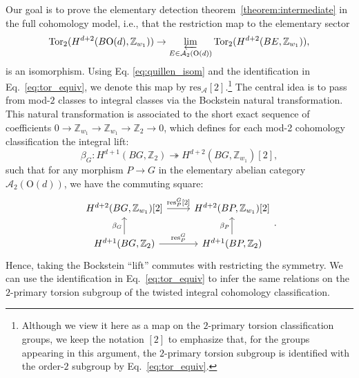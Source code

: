 \documentclass[aps,prx,reprint,superscriptaddress,twocolumn,amsmath,amssymb,amsfonts, nofootinbib]{revtex4-2}
\newcommand{\res}{\text{res}}
\newcommand{\tor}{\text{Tor}}
\newcommand{\Z}{\mathbb{Z}}
\theoremstyle{apsstyle}
\begin{document}
{Our goal is to prove the elementary detection theorem~\ref{theorem:intermediate} in the full cohomology model, i.e., that the restriction map to the elementary sector
\begin{equation*}
  \tor_{2}(H^{d+2}(B\mathrm{O}(d), \Z_{w_{1}}))\to
  \varprojlim_{E\in\mathcal A_{2}(\mathrm{O}(d))}\tor_{2}(H^{d+2}(BE, \Z_{w_{1}})),
\end{equation*}
is an isomorphism. Using Eq. \ref{eq:quillen_isom} and the identification in Eq.~\ref{eq:tor_equiv}, we denote this map by $\res_{\mathcal A}[2]$.\footnote{Although we view it here as a map on the $2$-primary torsion classification groups, we keep the notation $[2]$ to emphasize that, for the groups appearing in this argument, the $2$-primary torsion subgroup is identified with the order-$2$ subgroup by Eq.~\ref{eq:tor_equiv}.} The central idea is to pass from mod-$2$ classes to integral classes via the Bockstein natural transformation. This natural transformation is associated to the short exact sequence of coefficients $0\to \Z_{w_{1}} \to \Z_{w_{1}} \to \Z_{2}\to 0$, which defines for each mod-2 cohomology classification the integral lift: 
\begin{equation*}
    \beta_{G}: H^{d+1}(BG, \Z_{2}) \twoheadrightarrow H^{d+2}(BG, \Z_{w_{1}})[2],
\end{equation*}
such that for any morphism $P \to G$ in the elementary abelian category $\mathcal{A}_{2}(\mathrm{O}(d))$, we have the commuting square:
\begin{equation*}
\begin{tikzcd}
H^{d+2}(BG, \mathbb{Z}_{w_{1}})[2]
\arrow[r, "\res^{G}_{P}\text{[}2\text{]}"] & H^{d+2}(BP, \mathbb{Z}_{w_{1}})[2]\\
H^{d+1}(BG, \mathbb{Z}_{2}) \arrow[r, "\res_{P}^{G}"] \arrow[u, "\beta_{G}"] &  H^{d+1}(BP, \mathbb{Z}_{2}) \arrow[u, "\beta_{P}"]
\end{tikzcd}.
\end{equation*}
\noindent Hence, taking the Bockstein ``lift'' commutes with restricting the symmetry. We can use the identification in Eq.~\ref{eq:tor_equiv} to infer the same relations on the $2$-primary torsion subgroup of the twisted integral cohomology classification.

\bigskip 

}
\end{document}

